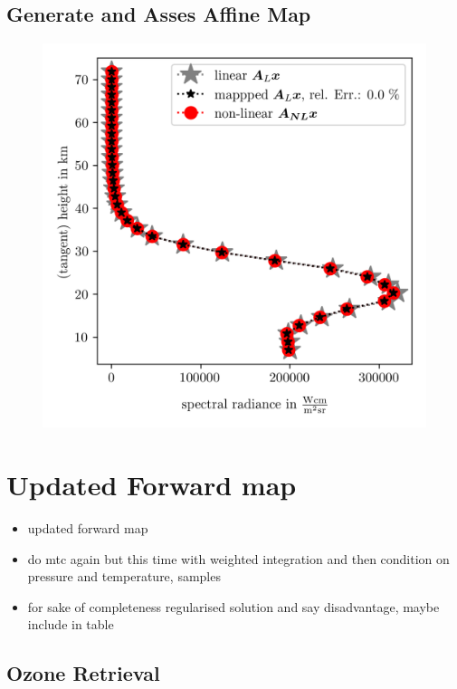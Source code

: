 \subsection{Generate and Asses Affine Map}
\begin{figure}[ht!]
	\centering
	\includegraphics{SampMapAssesment.png}
	\caption[]{}
	\label{fig:MapAsses}
\end{figure}


\section{Updated Forward map}

\begin{itemize}
	\item updated forward map
	\item do mtc again but this time with weighted integration and then condition on pressure and temperature, samples
	\item for sake of completeness regularised solution and say disadvantage, maybe include in table
\end{itemize}


\subsection{Ozone Retrieval}

